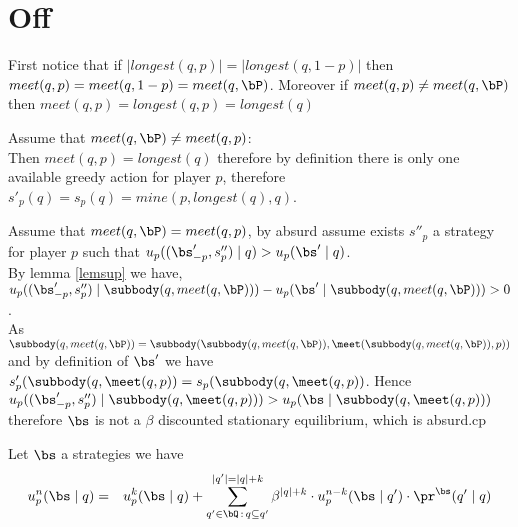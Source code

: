 

\section{Off}
First notice that if $|longest(q,p)| = |longest(q,1-p)|$ then $meet(q,p) = meet(q,1-p) = meet(q,\bP)$. Moreover if $meet(q,p) \neq meet(q,\bP)$ then $meet(q,p) = longest(q,p) = longest(q)$

Assume that $meet(q,\bP) \neq meet(q,p)$:
\\Then $meet(q,p) = longest(q)$ therefore by definition there is only one available greedy action for player $p$, therefore $s'_p(q) = s_p(q) = mine(p,longest(q),q)$. 

Assume that $meet(q,\bP) = meet(q,p)$,
by absurd assume exists $s''_p$ a strategy for player $p$ such that $u_p ((\bs'_{-p},s''_p) \mid q) > u_p(\bs' \mid q)$.
\\By lemma \ref{lemsup} we have, $u_p((\bs'_{-p},s''_p) \mid \subbody(q,meet(q,\bP))) - u_p(\bs' \mid \subbody(q,meet(q,\bP))) > 0$. 
\\As $\subbody(q,meet(q,\bP)) = \subbody(\subbody(q,meet(q,\bP)),\meet(\subbody(q,meet(q,\bP)),p))$ and by definition of $\bs'$ we have $s'_p(\subbody(q,\meet(q,p)) = s_p(\subbody(q,\meet(q,p))$. Hence $u_p((\bs'_{-p},s''_p) \mid \subbody(q,\meet(q,p))) > u_p(\bs \mid \subbody(q,\meet(q,p)))$ therefore $\bs$ is not a $\beta$ discounted stationary equilibrium, which is absurd.cp 

\begin{mylem}
	Let $\bs$ a strategies we have  
	\begin{eqnarray*}
		u_p^n(\bs \mid q) & = & u_p^k(\bs \mid q) + \sum_{q' \in \bQ \,:\, q \subseteq q'}^{|q'| = |q|+k} \beta^{|q|+k} \cdot  u_p^{n-k}(\bs \mid q') \cdot \pr^{\bs}(q' \mid q) \\
	\end{eqnarray*}
\end{mylem}



